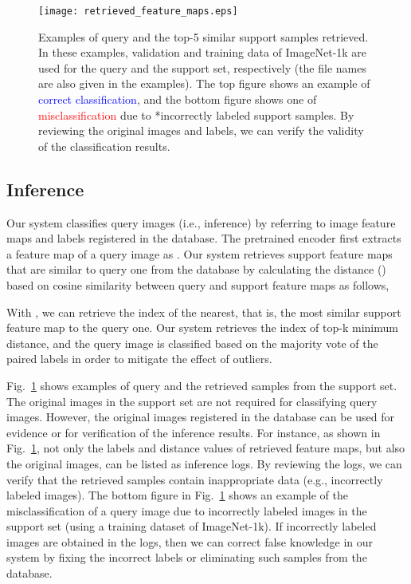 \documentclass[runningheads]{llncs}
\begin{document}
\begin{figure}[t]
   \begin{center}
   \texttt{[image: retrieved\_feature\_maps.eps]}
   \end{center}
   \caption{Examples of query and the top-5 similar support samples retrieved.
   In these examples, validation and training data of ImageNet-1k are used for the query and the support set, respectively (the file names are also given in the examples).
   The top figure shows an example of \textcolor{blue}{correct classification}, and the bottom figure shows one of \textcolor{red}{misclassification} due to *incorrectly labeled support samples.
   By reviewing the original images and labels, we can verify the validity of the classification results.}
   \label{fig:retrieved_features}
\end{figure}


\subsection{Inference}
\label{sec:pm_inference}

Our system classifies query images (i.e., inference) by referring to image feature maps and labels registered in the database.
The pretrained encoder first extracts a feature map  of a query image  as .
Our system retrieves support feature maps that are similar to query one from the database
by calculating the distance () based on cosine similarity between query and support feature maps as follows,

With , we can retrieve the index of the nearest, that is, the most similar support feature map to the query one.
Our system retrieves the index of top-k minimum distance, and the query image is classified based on the majority vote of the paired labels in order to mitigate the effect of outliers.

Fig.~\ref{fig:retrieved_features} shows examples of query and the retrieved samples from the support set.
The original images in the support set are not required for classifying query images.
However, the original images registered in the database can be used for evidence or for verification of the inference results.
For instance, as shown in Fig.~\ref{fig:retrieved_features}, not only the labels and distance values of retrieved feature maps,
but also the original images, can be listed as inference logs.
By reviewing the logs, we can verify that the retrieved samples contain inappropriate data (e.g., incorrectly labeled images).
The bottom figure in Fig.~\ref{fig:retrieved_features} shows an example of the misclassification
of a query image due to incorrectly labeled images in the support set (using a training dataset of ImageNet-1k).
If incorrectly labeled images are obtained in the logs, then we can correct false knowledge in our system 
by fixing the incorrect labels or eliminating such samples from the database.
\end{document}
